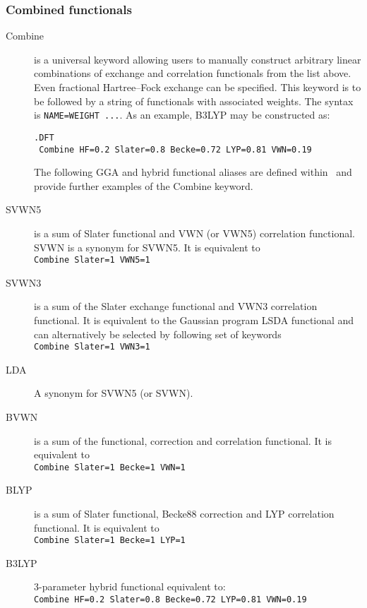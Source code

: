\subsubsection{Combined functionals}
\providecommand\funexample[1]{\\{\tt #1 }}
\begin{description}

\item[Combine] is a universal keyword allowing users to manually
  construct arbitrary linear combinations of exchange and correlation 
  functionals from the list above. Even fractional 
  Hartree--Fock exchange can be specified. This keyword is to be 
  followed by a string of functionals with associated weights. 
  The syntax is \verb|NAME=WEIGHT ...|. 
  As an example, B3LYP may be constructed as:
\begin{verbatim}
.DFT
 Combine HF=0.2 Slater=0.8 Becke=0.72 LYP=0.81 VWN=0.19
\end{verbatim}

The following GGA and hybrid functional aliases are defined within 
\dalton\ and provide further examples of the Combine keyword.

\item[SVWN5] is a sum of Slater functional and VWN (or VWN5) correlation
  functional. SVWN is a synonym for SVWN5. It is equivalent to
  \funexample{Combine Slater=1 VWN5=1}

\item[SVWN3] is a sum of the Slater exchange functional and VWN3 correlation
  functional. It is equivalent to the Gaussian program LSDA functional 
  and can alternatively be selected by following set of keywords
  \funexample{Combine Slater=1 VWN3=1}

\item[LDA] A synonym for SVWN5 (or SVWN). 

\item[BVWN] is a sum of the  functional,  correction and 
   correlation functional.  It is equivalent to 
  \funexample{Combine Slater=1 Becke=1 VWN=1}

\item[BLYP] is a sum of Slater functional, Becke88 correction and LYP
  correlation functional.  It is equivalent to 
  \funexample{Combine Slater=1 Becke=1 LYP=1}

\item[B3LYP] 3-parameter hybrid functional \cite{dft:b3lyp} equivalent to:
  \funexample{Combine HF=0.2 Slater=0.8 Becke=0.72 LYP=0.81 VWN=0.19}


\end{description}
